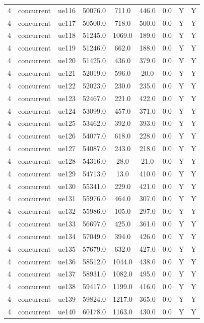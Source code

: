\begin{table}[ht]
\begin{tabular}{|c|c|c|c|c|c|c|c|c|}
4 & concurrent & ue116 & 50076.0 & 711.0 & 446.0 & 0.0 & Y & Y \\
4 & concurrent & ue117 & 50500.0 & 718.0 & 500.0 & 0.0 & Y & Y \\
4 & concurrent & ue118 & 51245.0 & 1069.0 & 189.0 & 0.0 & Y & Y \\
4 & concurrent & ue119 & 51246.0 & 662.0 & 188.0 & 0.0 & Y & Y \\
4 & concurrent & ue120 & 51425.0 & 436.0 & 379.0 & 0.0 & Y & Y \\
4 & concurrent & ue121 & 52019.0 & 596.0 & 20.0 & 0.0 & Y & Y \\
4 & concurrent & ue122 & 52023.0 & 230.0 & 235.0 & 0.0 & Y & Y \\
4 & concurrent & ue123 & 52467.0 & 221.0 & 422.0 & 0.0 & Y & Y \\
4 & concurrent & ue124 & 53099.0 & 457.0 & 371.0 & 0.0 & Y & Y \\
4 & concurrent & ue125 & 53462.0 & 392.0 & 393.0 & 0.0 & Y & Y \\
4 & concurrent & ue126 & 54077.0 & 618.0 & 228.0 & 0.0 & Y & Y \\
4 & concurrent & ue127 & 54087.0 & 243.0 & 218.0 & 0.0 & Y & Y \\
4 & concurrent & ue128 & 54316.0 & 28.0 & 21.0 & 0.0 & Y & Y \\
4 & concurrent & ue129 & 54713.0 & 13.0 & 410.0 & 0.0 & Y & Y \\
4 & concurrent & ue130 & 55341.0 & 229.0 & 421.0 & 0.0 & Y & Y \\
4 & concurrent & ue131 & 55976.0 & 464.0 & 307.0 & 0.0 & Y & Y \\
4 & concurrent & ue132 & 55986.0 & 105.0 & 297.0 & 0.0 & Y & Y \\
4 & concurrent & ue133 & 56697.0 & 425.0 & 361.0 & 0.0 & Y & Y \\
4 & concurrent & ue134 & 57049.0 & 394.0 & 426.0 & 0.0 & Y & Y \\
4 & concurrent & ue135 & 57679.0 & 632.0 & 427.0 & 0.0 & Y & Y \\
4 & concurrent & ue136 & 58512.0 & 1044.0 & 438.0 & 0.0 & Y & Y \\
4 & concurrent & ue137 & 58931.0 & 1082.0 & 495.0 & 0.0 & Y & Y \\
4 & concurrent & ue138 & 59417.0 & 1199.0 & 416.0 & 0.0 & Y & Y \\
4 & concurrent & ue139 & 59824.0 & 1217.0 & 365.0 & 0.0 & Y & Y \\
4 & concurrent & ue140 & 60178.0 & 1163.0 & 430.0 & 0.0 & Y & Y \\

\end{tabular}
\end{table}

